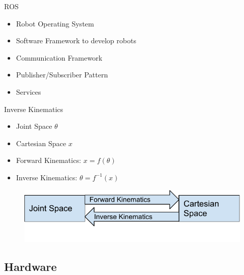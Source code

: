 \documentclass[t]{beamer}
\begin{document}
\begin{frame}{ROS}
\begin{itemize}
	\item Robot Operating System
	\item Software Framework to develop robots
	\item Communication Framework
	\item Publisher/Subscriber Pattern
	\item Services
\end{itemize}

\end{frame}

\begin{frame}{Inverse Kinematics}
\begin{itemize}
	\item Joint Space $\theta$
	\item Cartesian Space $x$
	\item Forward Kinematics: $x = f(\theta)$
	\item Inverse Kinematics: $\theta = f^{-1}(x)$
\end{itemize}

\begin{figure}
	\includegraphics[scale=0.6]{assets/chpt_basics/Kinematics}
\end{figure}
\end{frame}

\subsection{Hardware}
\end{document}
